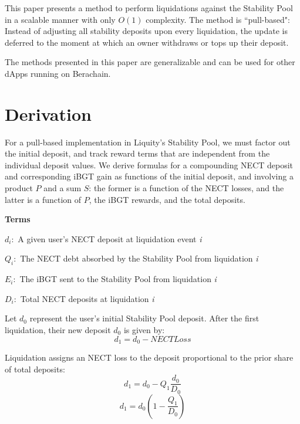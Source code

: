 \documentclass[reqno]{article}
\begin{document}
This paper presents a method to perform liquidations against the Stability Pool in a scalable manner with only $O(1)$ complexity. The method is ``pull-based": Instead of adjusting all stability deposits upon every liquidation, the update is deferred to the moment at which an owner withdraws or tops up their deposit.

The methods presented in this paper are generalizable and can be used for other dApps running on Berachain.

\section{Derivation}
For a pull-based implementation in Liquity’s Stability Pool, we must factor out the initial deposit, and track reward terms that are independent from the individual deposit values. We derive formulas for a compounding NECT deposit and corresponding iBGT gain as functions of the initial deposit, and involving a product $P$ and a sum $S$: the former is a function of the NECT losses, and the latter is a function of $P$, the iBGT rewards, and the total deposits.

\bigskip
\raggedright %

\textbf{Terms}
\begin{terms}
    \item $d_i:$ A given user’s NECT deposit at liquidation event \textit{i}\\
    \item $Q_i:$ The NECT debt absorbed by the Stability Pool from liquidation \textit{i}\\
    \item $E_i:$ The iBGT sent to the Stability Pool from liquidation \textit{i}\\
    \item $D_i:$ Total NECT deposits at liquidation \textit{i}
\end{terms}

\bigskip
Let $d_0$ represent the user’s initial Stability Pool deposit. After the first liquidation, their new
deposit $d_0$ is given by:\\
\begin{equation} 
    d_1=d_0-NECTLoss
\end{equation}

\bigskip
Liquidation assigns an NECT loss to the deposit proportional to the prior share of total deposits:
\begin{equation} \label{eq:2}
    d_1=d_0-Q_1\frac{d_0}{D_0}
\end{equation}
\begin{equation} 
    d_1=d_0\left(1-\frac{Q_1}{D_0}\right)
\end{equation}
\end{document}
